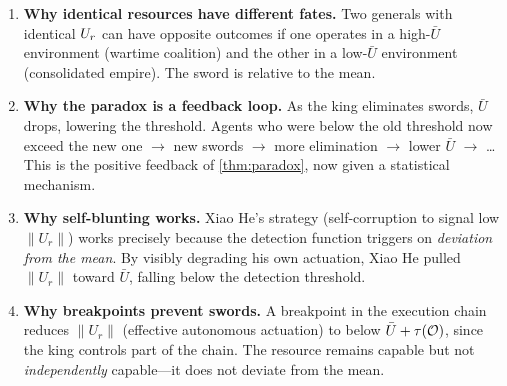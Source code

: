 \begin{enumerate}
  \item \textbf{Why identical resources have different fates.} Two
  generals with identical $U_r$ can have opposite outcomes if one
  operates in a high-$\bar{U}$ environment (wartime coalition) and
  the other in a low-$\bar{U}$ environment (consolidated empire).
  The sword is relative to the mean.

  \item \textbf{Why the paradox is a feedback loop.} As the king
  eliminates swords, $\bar{U}$ drops, lowering the threshold. Agents
  who were below the old threshold now exceed the new one $\to$ new
  swords $\to$ more elimination $\to$ lower $\bar{U}$ $\to$ \ldots
  This is the positive feedback of \cref{thm:paradox}, now given a
  statistical mechanism.

  \item \textbf{Why self-blunting works.} Xiao He's strategy
  (self-corruption to signal low $\|U_r\|$) works precisely because
  the detection function triggers on \emph{deviation from the mean}.
  By visibly degrading his own actuation, Xiao He pulled $\|U_r\|$
  toward $\bar{U}$, falling below the detection threshold.

  \item \textbf{Why breakpoints prevent swords.} A breakpoint in the
  execution chain reduces $\|U_r\|$ (effective autonomous actuation)
  to below $\bar{U} + \tau(\mathcal{O})$, since the king controls part of
  the chain. The resource remains capable but not \emph{independently}
  capable---it does not deviate from the mean.
\end{enumerate}

